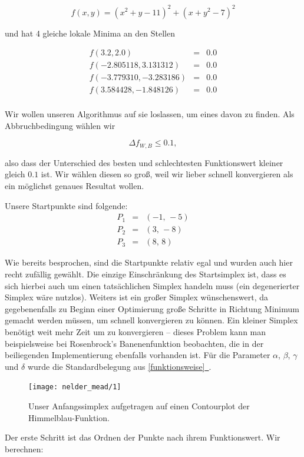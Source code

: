 \documentclass[naustrian]{article}
\newcommand*{\fullref}[1]{\hyperref[{#1}]{\autoref*{#1}~\nameref*{#1}}}
\begin{document}
{\[
    f(x,y) = (x^2 + y - 11)^2 + (x + y^2 - 7)^2
\]

und hat 4 gleiche lokale Minima an den Stellen

\begin{eqnarray*}
    f(3.2, 2.0) & = & 0.0\\
    f(-2.805118, 3.131312) & = & 0.0\\
    f(-3.779310, -3.283186) & = & 0.0\\
    f(3.584428, -1.848126) & = & 0.0\\
\end{eqnarray*}

Wir wollen unseren Algorithmus auf sie loslassen, um eines davon zu finden. Als
Abbruchbedingung wählen wir

\[
    \Delta f_{W,B} \leq 0.1,
\]

also dass der Unterschied des besten und schlechtesten Funktionswert kleiner
gleich $0.1$ ist. Wir wählen diesen so groß, weil wir lieber schnell
konvergieren als ein möglichst genaues Resultat wollen.

Unsere Startpunkte sind folgende:
\begin{eqnarray*}
    P_{1} & = & (-1,\,-5)\\
    P_{2} & = & (3,\,-8)\\
    P_{3} & = & (8,\,8)
\end{eqnarray*}

Wie bereits besprochen, sind die Startpunkte relativ egal und wurden auch hier
recht zufällig gewählt. Die einzige Einschränkung des Startsimplex ist, dass es
sich hierbei auch um einen tatsächlichen Simplex handeln muss (ein
degenerierter Simplex wäre nutzlos). Weiters ist ein großer Simplex
wünschenswert, da gegebenenfalls zu Beginn einer Optimierung große Schritte in
Richtung Minimum gemacht werden müssen, um schnell konvergieren zu können. Ein
kleiner Simplex benötigt weit mehr Zeit um zu konvergieren -- dieses Problem
kann man beispielsweise bei Rosenbrock's Banenenfunktion beobachten, die in der
beiliegenden Implementierung ebenfalls vorhanden ist. Für die Parameter $\alpha$,
$\beta$, $\gamma$ und $\delta$ wurde die Standardbelegung aus \fullref{funktionsweise}.

\begin{figure}[h]
    \centering
    \texttt{[image: nelder\_mead/1]}
    \caption{Unser Anfangssimplex aufgetragen auf einen Contourplot der Himmelblau-Funktion.}
\end{figure}

Der erste Schritt ist das Ordnen der Punkte nach ihrem Funktionswert. Wir berechnen:

}
\end{document}
